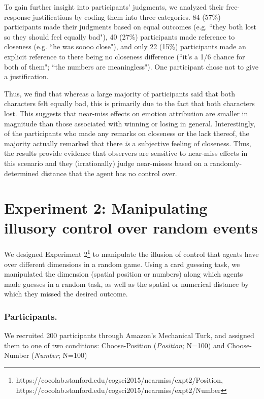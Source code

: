 \documentclass[10pt,letterpaper]{article}
\begin{document}
	To gain further insight into participants' judgments, we analyzed their free-response justifications by coding them into three categories. 84 (57\%) participants made their judgments based on equal outcomes (e.g. ``they both lost so they should feel equally bad"), 40 (27\%) participants made reference to closeness (e.g. ``he was soooo close"), and only 22 (15\%) participants made an explicit reference to there being no closeness difference (``it's a 1/6 chance for both of them"; ``the numbers are meaningless"). One participant chose not to give a justification. 


	Thus, we find that whereas a large majority of participants said that both characters felt equally bad, this is primarily due to the fact that both characters lost. This suggests that near-miss effects on emotion attribution are smaller in magnitude than those associated with winning or losing in general. Interestingly, of the participants who made any remarks on closeness or the lack thereof, the majority actually remarked that there \textit{is} a subjective feeling of closeness. Thus, the results provide evidence that observers are sensitive to near-miss effects in this scenario and they (irrationally) judge near-misses based on a randomly-determined distance that the agent has no control over.





\section{Experiment 2: Manipulating illusory control over random events}


We designed Experiment 2\footnote{https://cocolab.stanford.edu/cogsci2015/nearmiss/expt2/Position, https://cocolab.stanford.edu/cogsci2015/nearmiss/expt2/Number} to manipulate the illusion of control that agents have over different dimensions in a random game. Using a card guessing task, we manipulated the dimension (spatial position or numbers) along which agents made guesses in a random task, as well as the spatial or numerical distance by which they missed the desired outcome.  


\subsubsection{Participants.} We recruited 200 participants through Amazon's Mechanical Turk, and assigned them to one of two conditions: Choose-Position (\textit{Position}; N=100) and Choose-Number (\textit{Number}; N=100)
\end{document}

